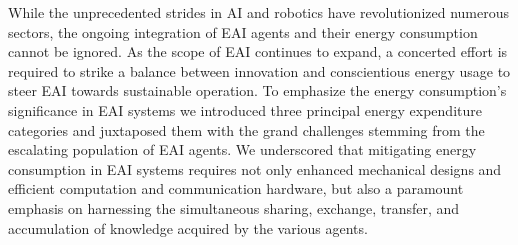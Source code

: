 \documentclass[12pt]{article}
\begin{document}
While the unprecedented strides in AI and robotics have revolutionized numerous sectors, the ongoing integration of EAI agents and their energy consumption cannot be ignored. As the scope of EAI continues to expand, a concerted effort is required to strike a balance between innovation and conscientious energy usage to steer EAI towards sustainable operation. To emphasize the energy consumption's significance in EAI systems we introduced three principal energy expenditure categories and juxtaposed them with the grand challenges stemming from the escalating population of EAI agents. We underscored that mitigating energy consumption in EAI systems requires not only enhanced mechanical designs and efficient computation and communication hardware, but also a paramount emphasis on harnessing the simultaneous sharing, exchange, transfer, and accumulation of knowledge acquired by the various agents.

\end{document}

